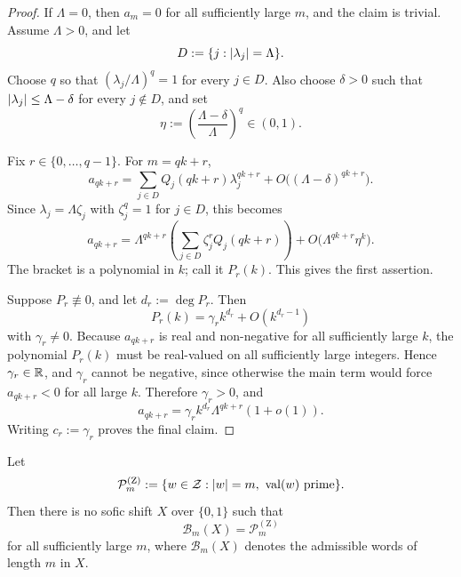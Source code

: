 \begin{proof}
  If \(\Lambda=0\), then \(a_m=0\) for all sufficiently large \(m\), and
  the claim is trivial. Assume \(\Lambda>0\), and let
  \[
    D:=\{j: \lvert \lambda_j \rvert=\Lambda\}.
  \]
  Choose \(q\) so that \((\lambda_j/\Lambda)^q=1\) for every \(j\in D\).
  Also choose \(\delta>0\) such that \(\lvert \lambda_j \rvert\le \Lambda-\delta\)
  for every \(j\notin D\), and set
  \[
    \eta:=\left(\frac{\Lambda-\delta}{\Lambda}\right)^q\in(0,1).
  \]

  Fix \(r\in\{0,\dots,q-1\}\). For \(m=qk+r\),
  \[
    a_{qk+r}
    =\sum_{j\in D}Q_j(qk+r)\lambda_j^{qk+r}
     +O\bigl((\Lambda-\delta)^{qk+r}\bigr).
  \]
  Since \(\lambda_j=\Lambda\zeta_j\) with \(\zeta_j^q=1\) for \(j\in D\),
  this becomes
  \[
    a_{qk+r}
    =\Lambda^{qk+r}
      \left(
        \sum_{j\in D}\zeta_j^r Q_j(qk+r)
      \right)
      +O\bigl(\Lambda^{qk+r}\eta^k\bigr).
  \]
  The bracket is a polynomial in \(k\); call it \(P_r(k)\). This gives
  the first assertion.

  Suppose \(P_r\not\equiv 0\), and let \(d_r:=\deg P_r\). Then
  \[
    P_r(k)=\gamma_r k^{d_r}+O(k^{d_r-1})
  \]
  with \(\gamma_r\neq 0\). Because \(a_{qk+r}\) is real and
  non-negative for all sufficiently large \(k\), the polynomial
  \(P_r(k)\) must be real-valued on all sufficiently large integers.
  Hence \(\gamma_r\in\mathbb{R}\), and \(\gamma_r\) cannot be negative, since
  otherwise the main term would force \(a_{qk+r}<0\) for all large
  \(k\). Therefore \(\gamma_r>0\), and
  \[
    a_{qk+r}
    =\gamma_r k^{d_r}\Lambda^{qk+r}(1+o(1)).
  \]
  Writing \(c_r:=\gamma_r\) proves the final claim.
\end{proof}

\begin{theorem}
  \label{thm:zeckendorf-primes-not-sofic}
  Let
  \[
    \mathcal P_m^{(\mathrm Z)}
    :=\{w\in\mathcal Z:\lvert w \rvert=m,\ \operatorname{val}(w)\text{ prime}\}.
  \]
  Then there is no sofic shift \(X\) over \(\{0,1\}\) such that
  \[
    \mathcal B_m(X)=\mathcal P_m^{(\mathrm Z)}
  \]
  for all sufficiently large \(m\), where \(\mathcal B_m(X)\) denotes
  the admissible words of length \(m\) in \(X\).
\end{theorem}

